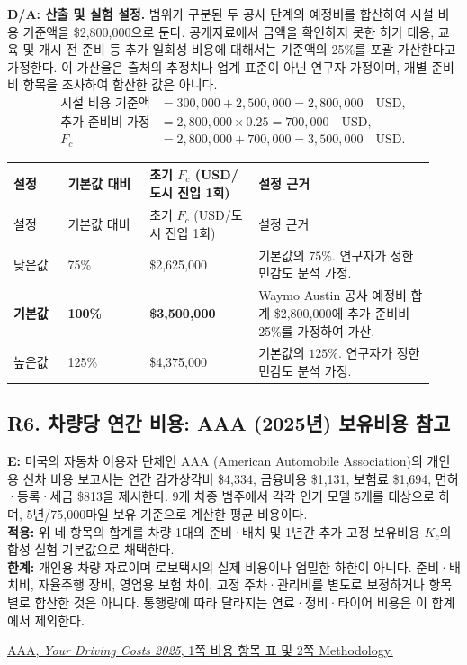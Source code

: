 \documentclass[10pt,a4paper]{article}
\begin{document}
\textbf{D/A: 산출 및 실험 설정.}
범위가 구분된 두 공사 단계의 예정비를 합산하여
시설 비용 기준액을 \$2,800,000으로 둔다.
공개자료에서 금액을 확인하지 못한 허가 대응, 교육 및 개시 전 준비 등
추가 일회성 비용에 대해서는 기준액의 25\%를 포괄 가산한다고 가정한다.
이 가산율은 출처의 추정치나 업계 표준이 아닌 연구자 가정이며,
개별 준비비 항목을 조사하여 합산한 값은 아니다.
\[
\begin{aligned}
\text{시설 비용 기준액}
&=300{,}000+2{,}500{,}000=2{,}800{,}000\quad\text{USD},\\
\text{추가 준비비 가정}
&=2{,}800{,}000\times0.25=700{,}000\quad\text{USD},\\
F_c&=2{,}800{,}000+700{,}000
=3{,}500{,}000\quad\text{USD}.
\end{aligned}
\]

\begingroup
\small
\setlength{\tabcolsep}{4pt}
\renewcommand{\arraystretch}{1.2}
\begin{longtable}{@{}
P{0.12\linewidth}
P{0.18\linewidth}
P{0.24\linewidth}
P{0.39\linewidth}
@{}}
\toprule
설정 & 기본값 대비 & 초기 $F_c$ \newline (USD/도시 진입 1회) & 설정 근거 \\
\midrule
\endfirsthead
\toprule
설정 & 기본값 대비 & 초기 $F_c$ \newline (USD/도시 진입 1회) & 설정 근거 \\
\midrule
\endhead
낮은값 & 75\% & \$2,625,000
& 기본값의 $75\%$. 연구자가 정한 민감도 분석 가정. \\
\addlinespace
\textbf{기본값} & \textbf{100\%} & \textbf{\$3,500,000}
& Waymo Austin 공사 예정비 합계 \$2,800,000에
추가 준비비 25\%를 가정하여 가산. \\
\addlinespace
높은값 & 125\% & \$4,375,000
& 기본값의 $125\%$. 연구자가 정한 민감도 분석 가정. \\
\bottomrule
\end{longtable}
\endgroup
\noindent

\subsection*{\hypertarget{rationale-R6}{R6. 차량당 연간 비용: AAA (2025년) 보유비용 참고}}
\noindent
\textbf{E:} 미국의 자동차 이용자 단체인 AAA (American Automobile Association)의 개인용 신차 비용 보고서는 연간 감가상각비 \$4,334, 금융비용 \$1,131, 보험료 \$1,694, 면허·등록·세금 \$813을 제시한다. 9개 차종 범주에서 각각 인기 모델 5개를 대상으로 하며, 5년/75,000마일 보유 기준으로 계산한 평균 비용이다.\\
\textbf{적용:} 위 네 항목의 합계를 차량 1대의 준비·배치 및 1년간 추가 고정 보유비용 $K_c$의 합성 실험 기본값으로 채택한다.\\
\textbf{한계:} 개인용 차량 자료이며 로보택시의 실제 비용이나 엄밀한 하한이 아니다. 준비·배치비, 자율주행 장비, 영업용 보험 차이, 고정 주차·관리비를 별도로 보정하거나 항목별로 합산한 것은 아니다. 통행량에 따라 달라지는 연료·정비·타이어 비용은 이 합계에서 제외한다.
\par\href{https://newsroom.aaa.com/wp-content/uploads/2025/09/UPDATE-AAA-Fact-Sheet-Your-Driving-Cost-9.2025-1.pdf#page=1}{AAA, \textit{Your Driving Costs 2025}, 1쪽 비용 항목 표 및 2쪽 Methodology.}
\end{document}
